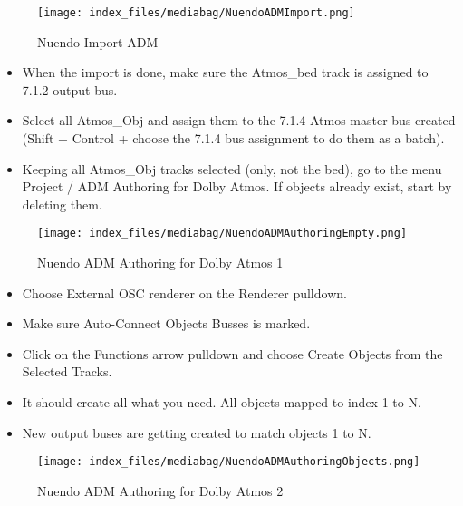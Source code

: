 \documentclass[
  letterpaper,
  DIV=11,
  numbers=noendperiod]{scrreport}
\providecommand{\tightlist}{%
  \setlength{\itemsep}{0pt}\setlength{\parskip}{0pt}}\usepackage{longtable,booktabs,array}
\begin{document}
\begin{figure}

{\centering \texttt{[image: index\_files/mediabag/NuendoADMImport.png]}

}

\caption{Nuendo Import ADM}

\end{figure}

\begin{itemize}
\tightlist
\item
  When the import is done, make sure the Atmos\_bed track is assigned to
  7.1.2 output bus.
\item
  Select all Atmos\_Obj and assign them to the 7.1.4 Atmos master bus
  created (Shift + Control + choose the 7.1.4 bus assignment to do them
  as a batch).
\item
  Keeping all Atmos\_Obj tracks selected (only, not the bed), go to the
  menu Project / ADM Authoring for Dolby Atmos. If objects already
  exist, start by deleting them.
\end{itemize}

\begin{figure}

{\centering \texttt{[image: index\_files/mediabag/NuendoADMAuthoringEmpty.png]}

}

\caption{Nuendo ADM Authoring for Dolby Atmos 1}

\end{figure}

\begin{itemize}
\tightlist
\item
  Choose External OSC renderer on the Renderer pulldown.
\item
  Make sure Auto-Connect Objects Busses is marked.
\item
  Click on the Functions arrow pulldown and choose Create Objects from
  the Selected Tracks.
\item
  It should create all what you need. All objects mapped to index 1 to
  N.
\item
  New output buses are getting created to match objects 1 to N.
\end{itemize}

\begin{figure}

{\centering \texttt{[image: index\_files/mediabag/NuendoADMAuthoringObjects.png]}

}

\caption{Nuendo ADM Authoring for Dolby Atmos 2}

\end{figure}
\end{document}
